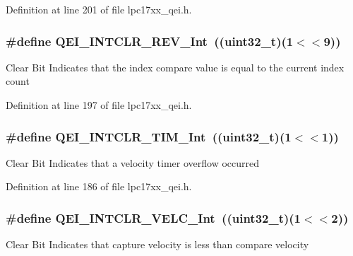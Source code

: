 \-Definition at line 201 of file lpc17xx\-\_\-qei.\-h.

\hypertarget{group___q_e_i___private___macros_ga51b9e2a221d3b61cfa2e4767e2e833b6}{
\subsubsection[{\-Q\-E\-I\-\_\-\-I\-N\-T\-C\-L\-R\-\_\-\-R\-E\-V\-\_\-\-Int}]{\setlength{\rightskip}{0pt plus 5cm}\#define {\bf \-Q\-E\-I\-\_\-\-I\-N\-T\-C\-L\-R\-\_\-\-R\-E\-V\-\_\-\-Int}~((uint32\-\_\-t)(1$<$$<$9))}}\label{group___q_e_i___private___macros_ga51b9e2a221d3b61cfa2e4767e2e833b6}
\-Clear \-Bit \-Indicates that the index compare value is equal to the current index count 

\-Definition at line 197 of file lpc17xx\-\_\-qei.\-h.

\hypertarget{group___q_e_i___private___macros_gad8ce4680609ec20eacd0cecd1f3d6b48}{
\subsubsection[{\-Q\-E\-I\-\_\-\-I\-N\-T\-C\-L\-R\-\_\-\-T\-I\-M\-\_\-\-Int}]{\setlength{\rightskip}{0pt plus 5cm}\#define {\bf \-Q\-E\-I\-\_\-\-I\-N\-T\-C\-L\-R\-\_\-\-T\-I\-M\-\_\-\-Int}~((uint32\-\_\-t)(1$<$$<$1))}}\label{group___q_e_i___private___macros_gad8ce4680609ec20eacd0cecd1f3d6b48}
\-Clear \-Bit \-Indicates that a velocity timer overflow occurred 

\-Definition at line 186 of file lpc17xx\-\_\-qei.\-h.

\hypertarget{group___q_e_i___private___macros_gabce6b911d3ab9a7387bb377846fc3173}{
\subsubsection[{\-Q\-E\-I\-\_\-\-I\-N\-T\-C\-L\-R\-\_\-\-V\-E\-L\-C\-\_\-\-Int}]{\setlength{\rightskip}{0pt plus 5cm}\#define {\bf \-Q\-E\-I\-\_\-\-I\-N\-T\-C\-L\-R\-\_\-\-V\-E\-L\-C\-\_\-\-Int}~((uint32\-\_\-t)(1$<$$<$2))}}\label{group___q_e_i___private___macros_gabce6b911d3ab9a7387bb377846fc3173}
\-Clear \-Bit \-Indicates that capture velocity is less than compare velocity 

